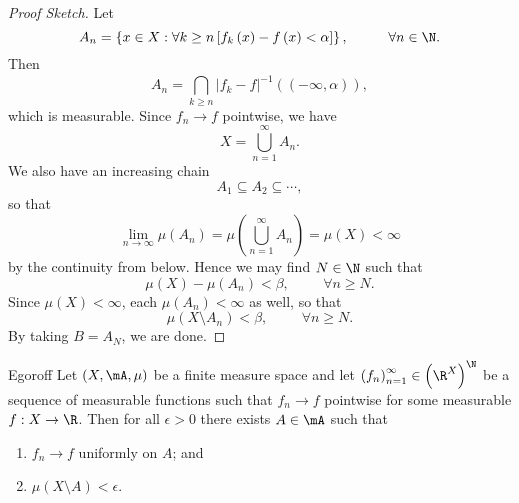\documentclass[pmath451]{subfiles}
\begin{document}
    \begin{proof}[Proof Sketch]
        Let
        \begin{equation*}
            A_n = \left\lbrace x\in X: \forall k\geq n\left[ f_k\left( x \right)-f\left( x \right)<\alpha \right] \right\rbrace ,\hspace{1cm}\forall n\in\N.
        \end{equation*}
        Then
        \begin{equation*}
            A_n = \bigcap^{}_{k\geq n} \left| f_k-f \right|^{-1}\left( \left( -\infty,\alpha \right) \right),
        \end{equation*}
        which is measurable. Since $f_n\to f$ pointwise, we have
        \begin{equation*}
            X = \bigcup^{\infty}_{n=1} A_n.
        \end{equation*}
        We also have an increasing chain
        \begin{equation*}
            A_1\subseteq A_2\subseteq\cdots,
        \end{equation*}
        so that
        \begin{equation*}
            \lim_{n\to\infty}\mu\left( A_n \right) = \mu\left( \bigcup^{\infty}_{n=1}A_n \right) = \mu\left( X \right) < \infty
        \end{equation*}
        by the continuity from below. Hence we may find $N\in\N$ such that
        \begin{equation*}
            \mu\left( X \right)-\mu\left( A_n \right) < \beta,\hspace{1cm}\forall n\geq N.
        \end{equation*}
        Since $\mu\left( X \right)<\infty$, each $\mu\left( A_n \right)<\infty$ as well, so that
        \begin{equation*}
            \mu\left( X\setminus A_n \right)<\beta,\hspace{1cm}\forall n\geq N.
        \end{equation*}
        By taking $B=A_N$, we are done.
    \end{proof}
    
    \clearpage

    \begin{theorem}{Egoroff}
        Let $\left( X,\mA,\mu \right)$ be a finite measure space and let $\left( f_{n} \right)^{\infty}_{n=1}\in\left( \R^{X} \right)^{\N}$ be a sequence of measurable functions such that $f_n\to f$ pointwise for some measurable $f:X\to\R$. Then for all $\epsilon>0$ there exists $A\in\mA$ such that
        \begin{enumerate}
            \item $f_n\to f$ uniformly on $A$; and
            \item $\mu\left( X\setminus A \right)<\epsilon$.
        \end{enumerate}
    \end{theorem}
    
\end{document}
